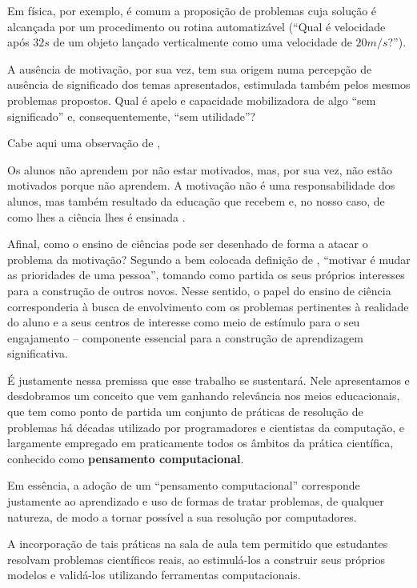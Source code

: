 Em física, por exemplo, é comum a proposição de problemas cuja solução é alcançada por um procedimento ou rotina automatizável (``Qual é velocidade após $32s$ de um objeto lançado verticalmente como uma velocidade de $20m/s$?''). 

A ausência de motivação, por sua vez, tem sua origem numa percepção de ausência de significado dos temas apresentados, estimulada também pelos mesmos problemas propostos. Qual é apelo e capacidade mobilizadora de algo ``sem significado'' e, consequentemente, ``sem utilidade''? 

Cabe aqui uma observação de ,

\begin{citacao}
Os alunos não aprendem por não estar motivados, mas, por sua vez, não estão motivados porque não aprendem. A motivação não é uma responsabilidade dos alunos, mas também resultado da educação que recebem e, no nosso caso, de como lhes a ciência lhes é ensinada \cite{Pozo}.
\end{citacao}

Afinal, como o ensino de ciências pode ser desenhado de forma a atacar o problema da motivação? Segundo a bem colocada definição de , ``motivar é mudar as prioridades de uma pessoa'', tomando como partida os seus próprios interesses para a construção de outros novos. Nesse sentido, o papel do ensino de ciência corresponderia à busca de envolvimento com os problemas pertinentes à realidade do aluno e a seus centros de interesse como meio de estímulo para o seu engajamento -- componente essencial para a construção de aprendizagem significativa. 

É justamente nessa premissa que esse trabalho se sustentará. Nele apresentamos e desdobramos um conceito que vem ganhando relevância nos meios educacionais, que tem como ponto de partida um conjunto de práticas de resolução de problemas há décadas utilizado por programadores e cientistas da computação, e largamente empregado em praticamente todos os âmbitos da prática científica, conhecido como \textbf{pensamento computacional}.

Em essência, a adoção de um ``pensamento computacional'' corresponde justamente ao aprendizado e uso de formas de tratar problemas, de qualquer natureza, de modo a tornar possível a sua resolução por computadores. 

A incorporação de tais práticas na sala de aula tem permitido que estudantes resolvam problemas científicos reais, ao estimulá-los a construir seus próprios modelos e validá-los utilizando ferramentas computacionais.

